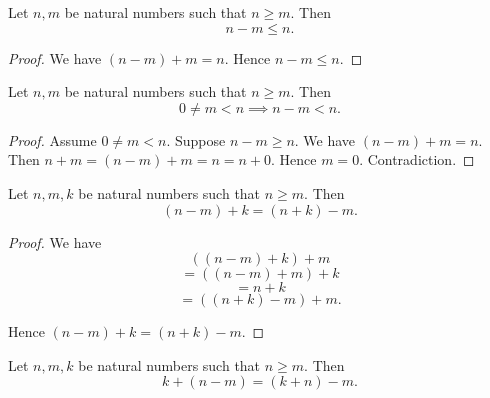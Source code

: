 \documentclass[10pt]{article}
\begin{document}
  \begin{forthel}
    \begin{proposition}
      Let $n, m$ be natural numbers such that $n \geq m$.
      Then \[ n - m \leq n. \]
    \end{proposition}
    \begin{proof}
      We have $(n - m) + m = n$.
      Hence $n - m \leq n$.
    \end{proof}
  \end{forthel}

  \begin{forthel}
    \begin{proposition}
      Let $n, m$ be natural numbers such that $n \geq m$.
      Then \[ 0 \neq m < n \implies n - m < n. \]
    \end{proposition}
    \begin{proof}
      Assume $0 \neq m < n$.
      Suppose $n - m \geq n$.
      We have $(n - m) + m = n$.
      Then $n + m
        = (n - m) + m
        = n
        = n + 0$.
      Hence $m = 0$.
      Contradiction.
    \end{proof}
  \end{forthel}

  \begin{forthel}
    \begin{proposition}
      Let $n, m, k$ be natural numbers such that $n \geq m$.
      Then \[ (n - m) + k = (n + k) - m. \]
    \end{proposition}
    \begin{proof}
      We have
      \[  ((n - m) + k) + m       \]
      \[    = ((n - m) + m) + k   \]
      \[    = n + k               \]
      \[    = ((n + k) - m) + m.  \]

      Hence $(n - m) + k = (n + k) - m$.
    \end{proof}
  \end{forthel}

  \begin{forthel}
    \begin{corollary}
      Let $n, m, k$ be natural numbers such that $n \geq m$.
      Then \[ k + (n - m) = (k + n) - m. \]
    \end{corollary}
  \end{forthel}
\end{document}
